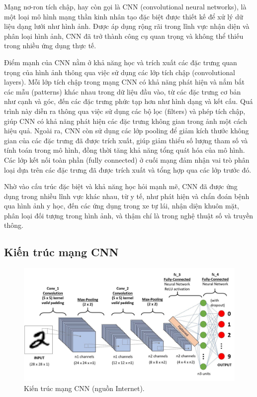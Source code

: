 Mạng nơ-ron tích chập, hay còn gọi là CNN (convolutional neural networks), là một loại mô hình mạng thần kinh nhân tạo đặc biệt được thiết kế để xử lý dữ liệu dạng lưới như hình ảnh. Được áp dụng rộng rãi trong lĩnh vực nhận diện và phân loại hình ảnh, CNN đã trở thành công cụ quan trọng và không thể thiếu trong nhiều ứng dụng thực tế.

Điểm mạnh của CNN nằm ở khả năng học và trích xuất các đặc trưng quan trọng của hình ảnh thông qua việc sử dụng các lớp tích chập (convolutional layers). Mỗi lớp tích chập trong mạng CNN có khả năng phát hiện và nắm bắt các mẫu (patterns) khác nhau trong dữ liệu đầu vào, từ các đặc trưng cơ bản như cạnh và góc, đến các đặc trưng phức tạp hơn như hình dạng và kết cấu. Quá trình này diễn ra thông qua việc sử dụng các bộ lọc (filters) và phép tích chập, giúp CNN có khả năng phát hiện các đặc trưng không gian trong ảnh một cách hiệu quả. Ngoài ra, CNN còn sử dụng các lớp pooling để giảm kích thước không gian của các đặc trưng đã được trích xuất, giúp giảm thiểu số lượng tham số và tính toán trong mô hình, đồng thời tăng khả năng tổng quát hóa của mô hình. Các lớp kết nối toàn phần (fully connected) ở cuối mạng đảm nhận vai trò phân loại dựa trên các đặc trưng đã được trích xuất và tổng hợp qua các lớp trước đó.

Nhờ vào cấu trúc đặc biệt và khả năng học hỏi mạnh mẽ, CNN đã được ứng dụng trong nhiều lĩnh vực khác nhau, từ y tế, như phát hiện và chẩn đoán bệnh qua hình ảnh y học, đến các ứng dụng trong xe tự lái, nhận diện khuôn mặt, phân loại đối tượng trong hình ảnh, và thậm chí là trong nghệ thuật số và truyền thông.

\subsection{Kiến trúc mạng CNN}

\begin{figure}[h]
	\centering
	\includegraphics[width=120mm]{fig/CNNarchitecture.jpg}
        \captionsetup{justification=centering}
	\caption{Kiến trúc mạng CNN (nguồn Internet).}
	\label{fig_CNNarchitecture}
\end{figure}

